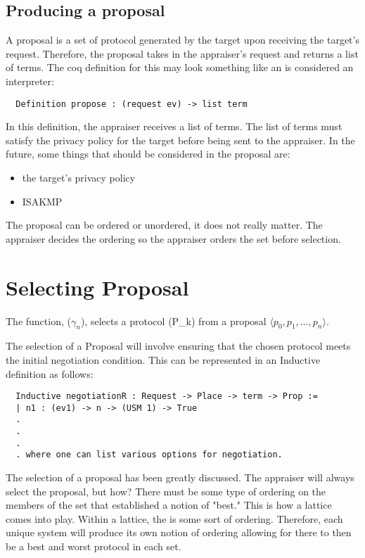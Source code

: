 \documentclass[10pt]{article}
\newcommand{\squash}{\itemsep=0pt\parskip=0pt}
\begin{document}
\subsection {Producing a proposal}

  A proposal is a set of protocol generated by the target upon receiving the target's request. Therefore, the proposal takes in the appraiser's request and returns a list of terms. The coq definition for this may look something like an is considered an interpreter: 
  
  \begin{verbatim}
  Definition propose : (request ev) -> list term
  \end{verbatim}  
  
  In this definition, the appraiser receives a list of terms. The list of terms must satisfy the privacy policy for the target before being sent to the appraiser. In the future, some things that should be considered in the proposal are:
  
  \begin{itemize}
   \squash
   \item the target's privacy policy
   \item ISAKMP
  \end{itemize}
  
	The proposal can be ordered or unordered, it does not really matter. The appraiser decides the ordering so the appraiser orders the set before selection.  

\section {Selecting Proposal}

  The function, ($\gamma_{n}$), selects a protocol (P_{k}) 
  from a proposal $\langle p_0,p_1,\ldots,p_n\rangle$.  

  The selection of a Proposal will involve ensuring that the chosen protocol meets the initial negotiation condition. This can be represented in an Inductive definition as follows:
  
  \begin{verbatim}
  Inductive negotiationR : Request -> Place -> term -> Prop :=
  | n1 : (ev1) -> n -> (USM 1) -> True
  .
  .
  .
  . where one can list various options for negotiation. 
  \end{verbatim} 
  
  	The selection of a proposal has been greatly discussed. The appraiser will always select the proposal, but how? There must be some type of ordering on the members of the set that established a notion of "best." This is how a lattice comes into play. Within a lattice, the is some sort of ordering. Therefore, each unique system will produce its own notion of ordering allowing for there to then be a best and worst protocol in each set. 
	
\end{document}

